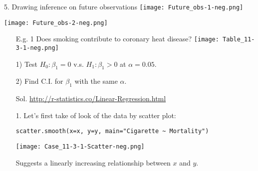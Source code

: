 \begin{frame}{5. Drawing inference on future observations}
\centering
	\texttt{[image: Future\_obs-1-neg.png]}
\end{frame}
\begin{frame}
\centering
	\texttt{[image: Future\_obs-2-neg.png]}
\end{frame}
\begin{frame}
\begin{enumerate}
\item[E.g. 1] Does smoking contribute to coronary heat disease?
\texttt{[image: Table\_11-3-1-neg.png]}
\item[]1) Test $H_0:\beta_1=0$ v.s. $H_1:\beta_1>0$ at $\alpha=0.05$.
\item[]2) Find C.I. for $\beta_1$ with the same $\alpha$.
\end{enumerate}
\end{frame}
\begin{frame}[fragile]
	\begin{enumerate}
		\item[Sol.] \url{http://r-statistics.co/Linear-Regression.html}
			\vfill
		\item[1.] Let's first take of look of the data by scatter plot:
\begin{center}
\begin{minipage}{0.6\textwidth}
\begin{lstlisting}
scatter.smooth(x=x, y=y, main="Cigarette ~ Mortality")
\end{lstlisting}
\end{minipage}
\texttt{[image: Case\_11-3-1-Scatter-neg.png]}
\end{center}
\vfill
\item[] Suggests a linearly increasing relationship between $x$ and $y$.
	\end{enumerate}
\end{frame}
